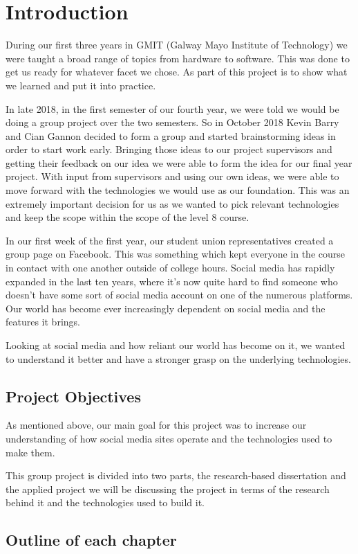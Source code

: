 \chapter{Introduction}
During our first three years in GMIT (Galway Mayo Institute of Technology) we were taught a broad range of topics from hardware to software. This was done to get us ready for whatever facet we chose. As part of this project is to show what we learned and put it into practice.

In late 2018, in the first semester of our fourth year, we were told we would be doing a group project over the two semesters. So in October 2018 Kevin Barry and Cian Gannon decided to form a group and started brainstorming ideas in order to start work early. Bringing those ideas to our project supervisors and getting their feedback on our idea we were able to form the idea for our final year project. With input from supervisors and using our own ideas, we were able to move forward with the technologies we would use as our foundation. This was an extremely important decision for us as we wanted to pick relevant technologies and keep the scope within the scope of the level 8 course. 

In our first week of the first year, our student union representatives created a group page on Facebook. This was something which kept everyone in the course in contact with one another outside of college hours. Social media has rapidly expanded in the last ten years, where it's now quite hard to find someone who doesn't have some sort of social media account on one of the numerous platforms. Our world has become ever increasingly dependent on social media and the features it brings.

Looking at social media and how reliant our world has become on it, we wanted to understand it better and have a stronger grasp on the underlying technologies.

 \section{Project Objectives}
 As mentioned above, our main goal for this project was to increase our understanding of how social media sites operate and the technologies used to make them.
 
 This group project is divided into two parts, the research-based dissertation and the applied project we will be discussing the project in terms of the research behind it and the technologies used to build it.
 
 \section{Outline of each chapter}

